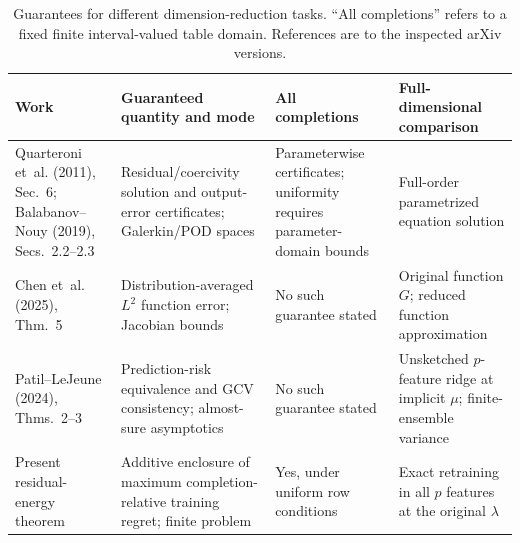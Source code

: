 \begin{table}[t]
\centering
\caption{Guarantees for different dimension-reduction tasks. ``All completions'' refers to a fixed finite interval-valued table domain. References are to the inspected arXiv versions.}
\label{tab:related_guarantees}
\small\setlength{\tabcolsep}{4pt}
\begin{tabular}{p{}p{}p{}p{}}
\toprule
Work & Guaranteed quantity and mode & All completions & Full-dimensional comparison \\
\midrule
Quarteroni et~al. (2011), Sec.~6; Balabanov--Nouy (2019), Secs.~2.2--2.3 & Residual/coercivity solution and output-error certificates; Galerkin/POD spaces & Parameterwise certificates; uniformity requires parameter-domain bounds & Full-order parametrized equation solution \\
Chen et~al. (2025), Thm.~5 & Distribution-averaged $L^2$ function error; Jacobian bounds & No such guarantee stated & Original function $G$; reduced function approximation \\
Patil--LeJeune (2024), Thms.~2--3 & Prediction-risk equivalence and GCV consistency; almost-sure asymptotics & No such guarantee stated & Unsketched $p$-feature ridge at implicit $\mu$; finite-ensemble variance \\
Present residual-energy theorem & Additive enclosure of maximum completion-relative training regret; finite problem & Yes, under uniform row conditions & Exact retraining in all $p$ features at the original $\lambda$ \\
\bottomrule
\end{tabular}
\end{table}

